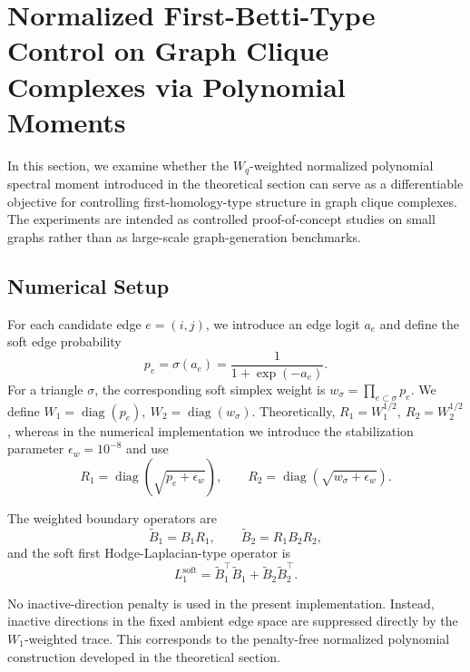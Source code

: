 \documentclass[pdflatex,sn-mathphys-num]{sn-jnl}%
\theoremstyle{thmstyleone}%
\theoremstyle{thmstyletwo}%
\theoremstyle{thmstylethree}%
\begin{document}
\section{Normalized First-Betti-Type Control on Graph Clique Complexes via Polynomial Moments}
\label{sec:graph_experiments}

In this section, we examine whether the \(W_q\)-weighted normalized polynomial spectral moment introduced in the theoretical section can serve as a differentiable objective for controlling first-homology-type structure in graph clique complexes.
The experiments are intended as controlled proof-of-concept studies on small graphs rather than as large-scale graph-generation benchmarks.


\subsection{Numerical Setup}

For each candidate edge \(e=(i,j)\), we introduce an edge logit \(a_e\) and define the soft edge probability
\[
p_e
=
\sigma(a_e)
=
\frac{1}{1+\exp(-a_e)}.
\]
For a triangle \(\sigma\), the corresponding soft simplex weight is
$w_\sigma
=
\prod_{e\subset\sigma}p_e$.
We define
$W_1
=
\operatorname{diag}(p_e),
~
W_2
=
\operatorname{diag}(w_\sigma)$.
Theoretically,
$R_1=W_1^{1/2},
~
R_2=W_2^{1/2}$,
whereas in the numerical implementation we introduce the stabilization parameter
$\epsilon_w=10^{-8}$
and use
\[
R_1
=
\operatorname{diag}
\left(
\sqrt{p_e+\epsilon_w}
\right),
\qquad
R_2
=
\operatorname{diag}
\left(
\sqrt{w_\sigma+\epsilon_w}
\right).
\]

The weighted boundary operators are
\[
\widetilde B_1
=
B_1R_1,
\qquad
\widetilde B_2
=
R_1B_2R_2,
\]
and the soft first Hodge-Laplacian-type operator is
\[
L_1^{\mathrm{soft}}
=
\widetilde B_1^\top\widetilde B_1
+
\widetilde B_2\widetilde B_2^\top.
\]

No inactive-direction penalty is used in the present implementation.
Instead, inactive directions in the fixed ambient edge space are suppressed directly by the \(W_1\)-weighted trace.
This corresponds to the penalty-free normalized polynomial construction developed in the theoretical section.
\end{document}

